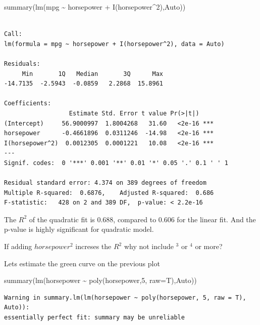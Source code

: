 \documentclass[
  letterpaper,
  DIV=11,
  numbers=noendperiod]{scrreprt}
\newenvironment{Shaded}{\begin{snugshade}}{\end{snugshade}}
\newcommand{\AttributeTok}[1]{\textcolor[rgb]{0.65,0.35,0.00}{#1}}
\newcommand{\DecValTok}[1]{\textcolor[rgb]{0.47,0.16,0.63}{#1}}
\newcommand{\FunctionTok}[1]{\textcolor[rgb]{0.02,0.16,0.49}{#1}}
\newcommand{\NormalTok}[1]{\textcolor[rgb]{0.33,0.33,0.33}{#1}}
\newcommand{\SpecialCharTok}[1]{\textcolor[rgb]{0.00,0.46,0.62}{#1}}
\begin{document}
\begin{Shaded}
\begin{Highlighting}[]
\FunctionTok{summary}\NormalTok{(}\FunctionTok{lm}\NormalTok{(mpg }\SpecialCharTok{\textasciitilde{}}\NormalTok{ horsepower }\SpecialCharTok{+} \FunctionTok{I}\NormalTok{(horsepower}\SpecialCharTok{\^{}}\DecValTok{2}\NormalTok{),Auto))}
\end{Highlighting}
\end{Shaded}

\begin{verbatim}

Call:
lm(formula = mpg ~ horsepower + I(horsepower^2), data = Auto)

Residuals:
     Min       1Q   Median       3Q      Max 
-14.7135  -2.5943  -0.0859   2.2868  15.8961 

Coefficients:
                  Estimate Std. Error t value Pr(>|t|)    
(Intercept)     56.9000997  1.8004268   31.60   <2e-16 ***
horsepower      -0.4661896  0.0311246  -14.98   <2e-16 ***
I(horsepower^2)  0.0012305  0.0001221   10.08   <2e-16 ***
---
Signif. codes:  0 '***' 0.001 '**' 0.01 '*' 0.05 '.' 0.1 ' ' 1

Residual standard error: 4.374 on 389 degrees of freedom
Multiple R-squared:  0.6876,    Adjusted R-squared:  0.686 
F-statistic:   428 on 2 and 389 DF,  p-value: < 2.2e-16
\end{verbatim}

The \(R^2\) of the quadratic fit is 0.688, compared to 0.606 for the
linear fit. And the p-value is highly significant for quadratic model.

If adding \(horsepower^2\) increses the \(R^2\) why not include \(^3\)
or \(^4\) or more?

Lets estimate the green curve on the previous plot

\begin{Shaded}
\begin{Highlighting}[]
\FunctionTok{summary}\NormalTok{(}\FunctionTok{lm}\NormalTok{(horsepower }\SpecialCharTok{\textasciitilde{}} \FunctionTok{poly}\NormalTok{(horsepower,}\DecValTok{5}\NormalTok{, }\AttributeTok{raw=}\NormalTok{T),Auto))}
\end{Highlighting}
\end{Shaded}

\begin{verbatim}
Warning in summary.lm(lm(horsepower ~ poly(horsepower, 5, raw = T), Auto)):
essentially perfect fit: summary may be unreliable
\end{verbatim}
\end{document}
